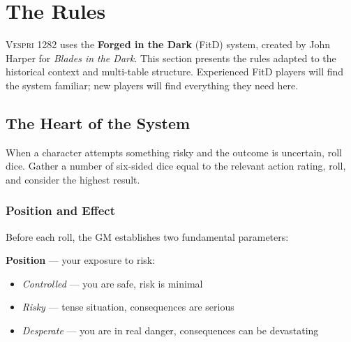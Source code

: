 
\chapter{The Rules}

\lettrine[lines=3]{V}{espri} 1282 uses the \textbf{Forged in the Dark}
(FitD) system, created by John Harper for \textit{Blades in the Dark}.
This section presents the rules adapted to the historical context and
multi-table structure. Experienced FitD players will find the system
familiar; new players will find everything they need here.

\section{The Heart of the System}

When a character attempts something risky and the outcome is uncertain,
roll dice. Gather a number of six-sided dice equal to the relevant action
rating, roll, and consider the highest result.


\subsection{Position and Effect}

Before each roll, the GM establishes two fundamental parameters:

\textbf{Position} --- your exposure to risk:
\begin{itemize}[nosep]
  \item \textit{Controlled} --- you are safe, risk is minimal
  \item \textit{Risky} --- tense situation, consequences are serious
  \item \textit{Desperate} --- you are in real danger, consequences
    can be devastating
\end{itemize}


